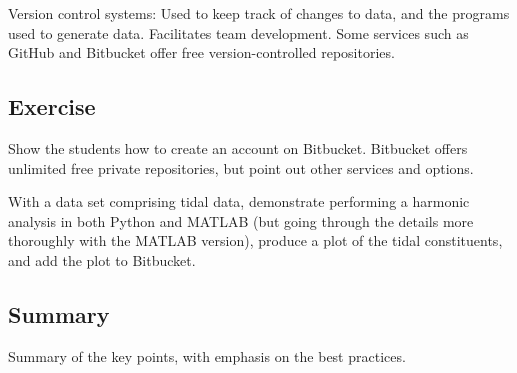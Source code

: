 \documentclass[a4paper,11pt]{article}
\begin{document}
Version control systems: Used to keep track of changes to data, and the programs used to generate data. Facilitates team development. Some services such as GitHub and Bitbucket offer free version-controlled repositories.

\subsection{Exercise}
Show the students how to create an account on Bitbucket. Bitbucket offers unlimited free private repositories, but point out other services and options.

With a data set comprising tidal data, demonstrate performing a harmonic analysis in both Python and MATLAB (but going through the details more thoroughly with the MATLAB version), produce a plot of the tidal constituents, and add the plot to Bitbucket.

\subsection{Summary}
Summary of the key points, with emphasis on the best practices.
\end{document}
